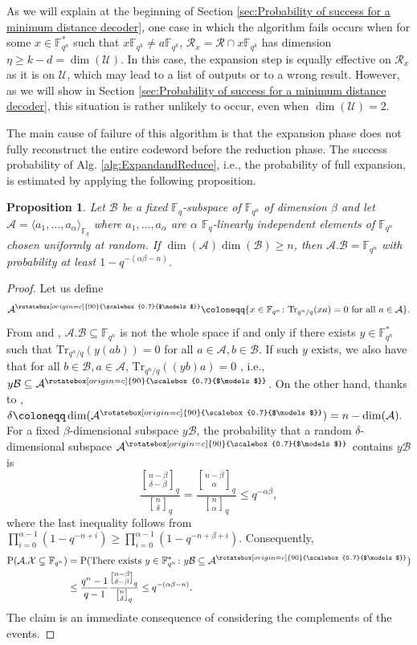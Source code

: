 \documentclass{article}
\newtheorem{proposition}{Proposition}
\newcommand{\Fq}{\mathbb{F}_{q}}
\newcommand{\Fqn}{\mathbb{F}_{q^n}}
\newcommand{\Fqk}{\mathbb{F}_{q^k}}
\newcommand{\calA}{\mathcal{A}}
\newcommand{\calB}{\mathcal{B}}
\newcommand{\calR}{\mathcal{R}}
\newcommand{\calU}{\mathcal{U}}
\newcommand{\calX}{\mathcal{X}}
\newcommand{\gbinom}[2]{\genfrac{[}{]}{0pt}{}{#1}{#2}}
\newcommand{\upmodels}{\mathrel{\rotatebox[origin=c]{90}{\scalebox{0.7}{$\models$}}}}
\begin{document}
As we will explain at the beginning of Section \ref{sec:Probability of success for a minimum distance decoder}, one case in which the algorithm fails occurs when for some $x \in \Fqn^*$ such that $x \Fqk \neq a \Fqk$, $\calR_x = \calR \cap x \Fqk$ has dimension $\eta\geq k - d = \dim(\calU)$. In this case, the expansion step is equally effective on $\calR_x$ as it is on $\calU$, which may lead to a list of outputs or to a wrong result. However, as we will show in Section \ref{sec:Probability of success for a minimum distance decoder}, this situation is rather unlikely to occur, even when $\dim(\calU) = 2$.
\par The main cause of failure of this algorithm is that the expansion phase does not fully reconstruct the entire codeword before the reduction phase. The success probability of Alg. \ref{alg:ExpandandReduce}, i.e., the probability of full expansion, is estimated by applying the following proposition.
\begin{proposition}
    \label{prop: expected dimension of the expansion when alpha x beta geq n}
    Let $\calB$ be a fixed $\Fq$-subspace of $\Fqn$ of dimension $\beta$ and let $\calA=\langle a_1,\ldots,a_{\alpha}\rangle_{\Fq}$ where $a_1,\ldots,a_{\alpha}$ are $\alpha$ $\Fq$-linearly independent elements of $\Fqn$ chosen uniformly at random.  If $\dim(\calA)\dim(\calB)\geq n$, then $\calA.\calB=\Fqn$ with probability at least $1-q^{-(\alpha\beta-n)}$.
\end{proposition}
\begin{proof}
    Let us define
    \[
    \calA^{\upmodels}\coloneqq\{x\in\Fqn\colon\mathrm{Tr}_{q^n/q}(xa)=0\text{ for all }a\in\calA\}.
    \]
    From \cite[\S 17, Theorems 1 and 2]{halmos1958finite} and \cite[Theorem 2.24]{lidl1994introduction}, $\calA.\calB\subseteq\Fqn$ is not the whole space if and only if there exists $y\in\Fqn^*$ such that $\mathrm{Tr}_{q^n/q}(y(ab))=0$ for all $a\in\calA, b\in\calB$. 
    If such $y$ exists, we also have that for all $b\in\calB, a\in\calA$, $\mathrm{Tr}_{q^n/q}((yb)a)=0$ , i.e., $y\calB\subseteq \calA^{\upmodels}$. On the other hand, thanks to \cite{taylor1992geometry}, $\delta\coloneqq\dim(\calA^{\upmodels})=n-\dim(\calA).$ For a fixed $\beta$-dimensional subspace $y\calB$, the probability that a random $\delta$-dimensional subspace $\calA^{\upmodels}$ contains $y\calB$ is \[
        \frac{\gbinom{n-\beta}{\delta-\beta}_{q}}{\gbinom{n}{\delta}_{q}}=\frac{\gbinom{n-\beta}{\alpha}_{q}}{\gbinom{n}{\alpha}_{q}} \leq q^{-\alpha\beta},
    \] 
    where the last inequality follows from $\prod_{i=0}^{\alpha-1} (1-q^{-n+i}) \geq \prod_{i=0}^{\alpha-1} (1-q^{-n+\beta+i}).$
    Consequently, 
    \begin{align*}
        \mathrm{P}(\calA.\calX\subsetneq\Fqn)&=\mathrm{P}(\text{There exists }y\in\Fqn^*\colon y\calB\subseteq \calA^{\upmodels})\\
        &\leq \frac{q^n-1}{q-1}\frac{\gbinom{n-\beta}{\delta-\beta}_{q}}{\gbinom{n}{\delta}_{q}}\leq q^{-(\alpha\beta-n)}.
    \end{align*}
    The claim is an immediate consequence of considering the complements of the events. 
\end{proof}
\end{document}
